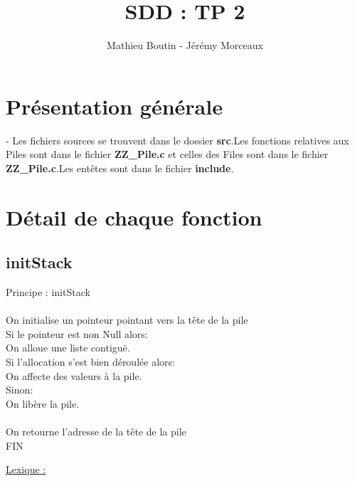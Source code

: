 \documentclass[a4paper]{article}
\title{SDD : TP 2}
\author{Mathieu Boutin - Jérémy Morceaux}
\newcommand\tab[1][1cm]{\hspace*{#1}}
\begin{document}
\maketitle
\section{Présentation générale}
- Les fichiers sources se trouvent dans le dossier \textbf{src}.Les fonctions relatives aux Piles sont dans le fichier \textbf{ZZ\_Pile.c} et celles des Files sont dans le fichier \textbf{ZZ\_Pile.c}.Les entêtes sont dans le fichier \textbf{include}.

\section{Détail de chaque fonction}

\subsection{initStack}

\begin{algorithm}

Principe : initStack
\\
\\
\tab On initialise un pointeur pointant vers la tête de la pile 
\\
\tab Si le pointeur est non Null alors:
\\
\tab \tab On alloue une liste contiguë.
\\
\tab \tab  Si l'allocation s'est bien déroulée alors:
\\
\tab \tab \tab On affecte des valeurs à la pile.
\\
\tab \tab Sinon:
\\ 
\tab \tab \tab  On libère la pile.
\\
\\
\tab On retourne l'adresse de la tête de la pile
\\



FIN

\end{algorithm}
\underline{Lexique :}
\end{document}
